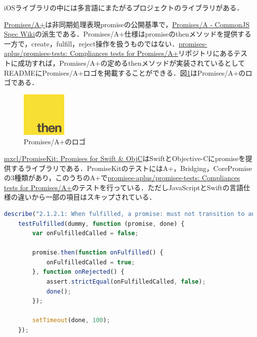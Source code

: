 iOSライブラリの中には多言語にまたがるプロジェクトのライブラリがある．

\href{https://promisesaplus.com/}{Promises/A+}は非同期処理表現promiseの公開基準で，\href{http://wiki.commonjs.org/wiki/Promises/A}{Promises/A - CommonJS Spec Wiki}の派生である．Promises/A+仕様はpromiseの{\sf then}メソッドを提供する一方で，create，fulfill，reject操作を扱うものではない\cite{promisesaplus.com}．\href{https://github.com/promises-aplus/promises-tests}{promises-aplus/promises-tests: Compliances tests for Promises/A+}リポジトリにあるテストに成功すれば，Promises/A+の定める{\sf then}メソッドが実装されているとしてREADMEにPromises/A+ロゴを掲載することができる\cite{github:promises-aplus/promises-tests}．図\ref{figure:promisesaplus.com:logo}はPromises/A+のロゴである．

\begin{figure}
    \centering
    \includegraphics{images/bodies/thirdparty/case/promisesaplus_logo-small.png}
    \caption{Promises/A+のロゴ}
    \label{figure:promisesaplus.com:logo}
\end{figure}

\href{https://github.com/mxcl/PromiseKit}{mxcl/PromiseKit: Promises for Swift \& ObjC}はSwiftとObjective-Cにpromiseを提供するライブラリである．PromiseKitのテストにはA+，Bridging，CorePromiseの3種類があり，このうちのA+で\href{https://github.com/promises-aplus/promises-tests}{promises-aplus/promises-tests: Compliances tests for Promises/A+}のテストを行っている．ただしJavaScriptとSwiftの言語仕様の違いから一部の項目はスキップされている\cite{github:mxcl/PromiseKit:Tests/A+/README.md}．

\begin{lstlisting}[language=javascript,caption=\href{https://github.com/promises-aplus/promises-tests/blob/4bab3171e3aeb4b3612c84ef28c128eb430be0a6/lib/tests/2.1.2.js}{Promises/A+におけるテスト2.1.2.1},label=lstlisting:promises-aplus/promises-tests:4bab317:lib/tests/2.1.2.js:11-23,firstnumber=11]
describe("2.1.2.1: When fulfilled, a promise: must not transition to any other state.", function () {
    testFulfilled(dummy, function (promise, done) {
        var onFulfilledCalled = false;

        promise.then(function onFulfilled() {
            onFulfilledCalled = true;
        }, function onRejected() {
            assert.strictEqual(onFulfilledCalled, false);
            done();
        });

        setTimeout(done, 100);
    });
\end{lstlisting}

